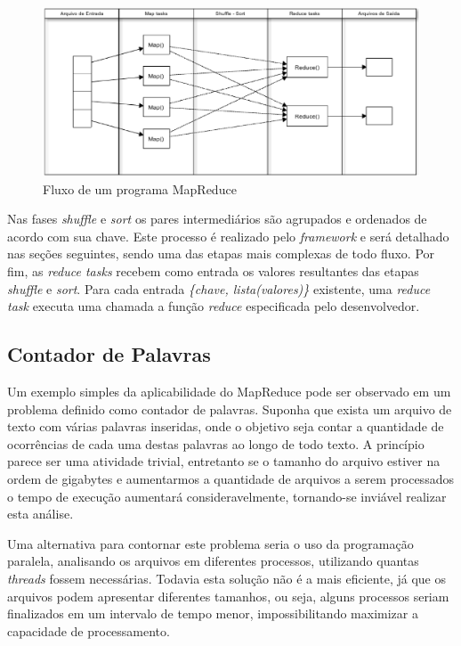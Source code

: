 \begin{figure}[ht!]
	\centering
	\includegraphics[keepaspectratio=true,scale=0.5]
	  {figuras/mapreduce.eps}
	\caption{Fluxo de um programa MapReduce}
	\label{fig-mapreduce}
\end{figure}

Nas fases \textit{shuffle} e \textit{sort} os pares intermediários são agrupados e ordenados de acordo com sua chave. Este processo é realizado pelo \textit{framework} e será detalhado nas seções seguintes, sendo uma das etapas mais complexas de todo fluxo. Por fim, as \textit{reduce tasks} recebem como entrada os valores resultantes das etapas \textit{shuffle} e \textit{sort}. Para cada entrada \textit{\{chave, lista(valores)\}} existente, uma \textit{reduce task} executa uma chamada a função \textit{reduce} especificada pelo desenvolvedor.

\subsection{Contador de Palavras}

Um exemplo simples da aplicabilidade do MapReduce pode ser observado em um problema definido como contador de palavras. Suponha que exista um arquivo de texto com várias palavras inseridas, onde o objetivo seja contar a quantidade de ocorrências de cada uma destas palavras ao longo de todo texto. A princípio parece ser uma atividade trivial, entretanto se o tamanho do arquivo estiver na ordem de gigabytes e aumentarmos a quantidade de arquivos a serem processados o tempo de execução aumentará consideravelmente, tornando-se inviável realizar esta análise.

Uma alternativa para contornar este problema seria o uso da programação paralela, analisando os arquivos em diferentes processos, utilizando quantas \textit{threads} fossem necessárias. Todavia esta solução não é a mais eficiente, já que os arquivos podem apresentar diferentes tamanhos, ou seja, alguns processos seriam finalizados em um intervalo de tempo menor, impossibilitando maximizar a capacidade de processamento. 

